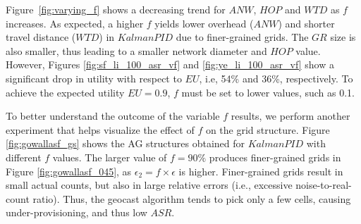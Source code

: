 \documentclass{USC-Thesis}
\numberwithin{equation}{chapter}
\begin{document}
Figure~\ref{fig:varying_f} shows a decreasing trend for $\mathit{ANW}$, $\mathit{HOP}$ and $\mathit{WTD}$ as $f$ increases. As expected, a higher $f$ yields lower overhead ($\mathit{ANW}$) and shorter travel distance ($\mathit{WTD}$) in $\mathit{KalmanPID}$ due to finer-grained grids. The $\mathit{GR}$ size is also smaller, thus leading to a smaller network diameter and $\mathit{HOP}$ value. However, Figures \ref{fig:sf_li_100_asr_vf} and \ref{fig:ye_li_100_asr_vf} show a significant drop in utility with respect to $\mathit{EU}$, i.e, 54\% and 36\%, respectively. To achieve the expected utility $\mathit{EU}=0.9$, $f$ must be set to lower values, such as 0.1. 


To better understand the outcome of the variable $f$ results, we perform another experiment that helps visualize the effect of $f$ on the grid structure.
Figure \ref{fig:gowallasf_gs} shows the AG structures obtained for $\mathit{KalmanPID}$ with different $f$ values. The larger value of $f = 90\%$ produces finer-grained grids in Figure \ref{fig:gowallasf_045}, as $\epsilon_2=f \times \epsilon$ is higher. Finer-grained grids result in small actual counts, but also in large relative errors (i.e., excessive noise-to-real-count ratio). Thus, the geocast algorithm tends to pick only a few cells, causing under-provisioning, and thus low $\mathit{ASR}$. 

\begin{comment}
\begin{figure*}[tbh]
	\begin{minipage}[b]{0.195\linewidth}
	\centering
		\texttt{[image: exps/ye\_li\_anw\_vk]}
		\subcaption{$\mathit{ANW}$, Ye.-Linear}
		\label{fig:ye_li_anw_vk}
	\end{minipage}
	\begin{minipage}[b]{0.195\linewidth}
	\centering
		\texttt{[image: exps/ye\_li\_hop\_vk]}
		\subcaption{$\mathit{HOP}$, Ye.-Linear}
		\label{fig:ye_li_hop_vk}
	\end{minipage}
	\begin{minipage}[b]{0.195\linewidth}
	\centering
		\texttt{[image: exps/ye\_li\_wtd\_vk]}
		\subcaption{$\mathit{WTD}$, Ye.-Linear}
		\label{fig:ye_li_wtd_vk}
	\end{minipage}	
	\begin{minipage}[b]{0.195\linewidth}
		\centering
		\texttt{[image: exps/ye\_li\_asr\_vk]}
		\subcaption{$\mathit{ASR}$, Ye.-Linear}
		\label{fig:ye_li_asr_vk}
	\end{minipage}
		\begin{minipage}[b]{0.195\linewidth}
		\centering
		\texttt{[image: exps/ye\_li\_cell\_vk]}
		\subcaption{$\mathit{CELL}$, Ye.-Linear}
		\label{fig:ye_li_cell_vk}
	\end{minipage}
	\caption{Varying number of workers required $K$ to complete a task.}
\label{fig:varying_k2}
\end{figure*}
\end{comment}
\end{document}
